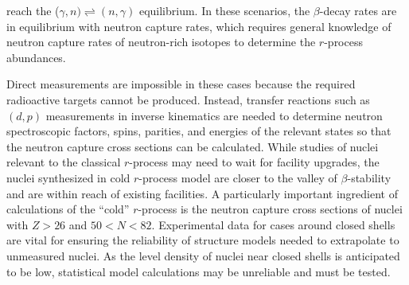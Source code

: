  reach the ($\gamma,n)\rightleftharpoons(n,\gamma)$ equilibrium. In these scenarios, the $\beta$-decay rates are in equilibrium with neutron capture rates, which %
 requires general knowledge of neutron capture rates of neutron-rich isotopes to determine the  $r$-process abundances.


Direct measurements are impossible in these cases because  the required radioactive targets cannot be produced. Instead, transfer reactions such as $(d,p)$ measurements in inverse kinematics are needed to determine neutron spectroscopic factors, spins, parities, and energies of the relevant states so that the neutron capture cross sections can be calculated.
While studies of nuclei relevant to the classical $r$-process may need to wait for facility upgrades, the nuclei synthesized in cold %
$r$-process model %
are closer to the valley of $\beta$-stability %
and are %
within reach %
of existing facilities.
A particularly important ingredient of calculations of the ``cold'' $r$-process %
is
the neutron capture cross sections of nuclei with $Z>26$ and $50<N<82$. Experimental data for cases around closed shells are vital for ensuring the reliability of structure models needed to extrapolate to unmeasured nuclei. As the level density of nuclei near closed shells is anticipated to be low, statistical model calculations may be unreliable and must be tested. %

\rhead{\desctext{\statename}}

